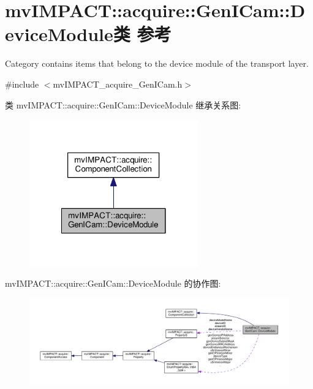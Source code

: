 \hypertarget{classmv_i_m_p_a_c_t_1_1acquire_1_1_gen_i_cam_1_1_device_module}{\section{mv\+I\+M\+P\+A\+C\+T\+:\+:acquire\+:\+:Gen\+I\+Cam\+:\+:Device\+Module类 参考}
\label{classmv_i_m_p_a_c_t_1_1acquire_1_1_gen_i_cam_1_1_device_module}
}


Category contains items that belong to the device module of the transport layer.  




{\ttfamily \#include $<$mv\+I\+M\+P\+A\+C\+T\+\_\+acquire\+\_\+\+Gen\+I\+Cam.\+h$>$}



类 mv\+I\+M\+P\+A\+C\+T\+:\+:acquire\+:\+:Gen\+I\+Cam\+:\+:Device\+Module 继承关系图\+:
\nopagebreak
\begin{figure}[H]
\begin{center}
\leavevmode
\includegraphics[width=206pt]{classmv_i_m_p_a_c_t_1_1acquire_1_1_gen_i_cam_1_1_device_module__inherit__graph}
\end{center}
\end{figure}


mv\+I\+M\+P\+A\+C\+T\+:\+:acquire\+:\+:Gen\+I\+Cam\+:\+:Device\+Module 的协作图\+:
\nopagebreak
\begin{figure}[H]
\begin{center}
\leavevmode
\includegraphics[width=350pt]{classmv_i_m_p_a_c_t_1_1acquire_1_1_gen_i_cam_1_1_device_module__coll__graph}
\end{center}
\end{figure}
